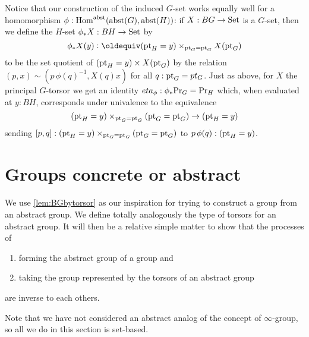 \begin{remark}
  \label{rem:inducedGsetfromabstracthomomorphisms}
  Notice that our construction of the induced $G$-set works equally well for a homomorphism $\phi:\mathrm{Hom}^{\mathrm{abst}}(\mathrm{abst}(G),\mathrm{abst}(H))$: if $X:BG\to\mathord{\mathrm{Set}}$ is a $G$-set, then we define the $H$-set $\phi_*X:BH\to\mathord{\mathrm{Set}}$ by 
$$\phi_*X(y)\defequi(\pt_H=y)\times_{\pt_G=\pt_G}X(\pt_G)$$ to be the set quotient of $({\mathord{\mathrm{pt}}}_H=y)\times X({\mathord{\mathrm{pt}}}_G)$ by the relation $(p,x)\sim(p\, \phi(q)^{-1},X(q)x)$ for all $q:{\mathord{\mathrm{pt}}}_G=pt_G$. Just as above, for $X$ the principal $G$-torsor we get an identity  $eta_\phi:\phi_*\mathrm{Pr}_{{G}}=\mathrm{Pr}_{{H}}$ which, when evaluated at $y:BH$, corresponds under univalence to the equivalence 
$$({\mathord{\mathrm{pt}}}_H=y)\times_{{\mathord{\mathrm{pt}}}_G={\mathord{\mathrm{pt}}}_G}({\mathord{\mathrm{pt}}}_G={\mathord{\mathrm{pt}}}_G)\to ({\mathord{\mathrm{pt}}}_H=y)$$ 
sending $[p,q]:({\mathord{\mathrm{pt}}}_H=y)\times_{{\mathord{\mathrm{pt}}}_G={\mathord{\mathrm{pt}}}_G}({\mathord{\mathrm{pt}}}_G={\mathord{\mathrm{pt}}}_G)$ to $p\,\phi(q):({\mathord{\mathrm{pt}}}_H=y)$.
\end{remark}


\section{Groups concrete or abstract%
}
\label{sec:Gsetforabstract}

We use \cref{lem:BGbytorsor} as our inspiration for trying to construct a group from an abstract group.  We define totally analogously the type of torsors for an abstract group.  It will then be a relative simple matter to show that the processes of
\begin{enumerate}
\item forming the abstract group of a group and 
\item taking the group represented by the torsors of an abstract group
\end{enumerate}
 are inverse to each others.

Note that we have not considered an abstract analog of the concept of $\infty$-group, so all we do in this section is set-based.

